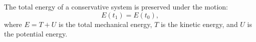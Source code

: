 The total energy of a conservative system is preserved under the motion:
$$E(t_1) = E(t_0),$$
where $E = T + U$ is the total mechanical energy, $T$ is the kinetic energy, and $U$ is the potential energy.
